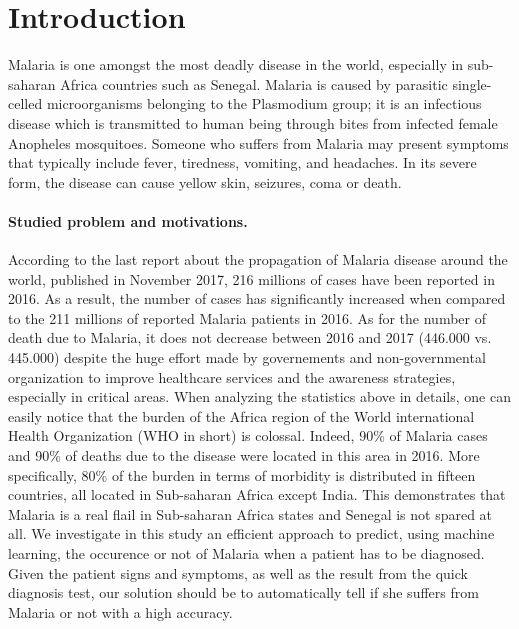 \section{Introduction}\label{intro}
Malaria is one amongst the most deadly disease in the world, especially in sub-saharan Africa countries such as Senegal.
Malaria is caused by parasitic single-celled microorganisms belonging to the Plasmodium group; it is an infectious
disease which is transmitted to human being through bites from infected female Anopheles mosquitoes. Someone who suffers
from  Malaria may present symptoms that typically include fever, tiredness, vomiting, and headaches. In its severe form,
the disease can cause yellow skin, seizures, coma or death.

\paragraph*{Studied problem and motivations.}
According to the last report about the propagation of Malaria disease around the world, published in November 2017, 216 millions of cases have been 
reported in 2016. As a result, the number of cases has significantly increased when compared to the 211 millions of reported Malaria patients in 2016.
As for the number of death due to Malaria, it does not decrease between 2016 and 2017 (446.000 vs. 445.000) despite the huge effort made by governements
and non-governmental organization to improve healthcare services and the awareness strategies, especially in critical areas. 
When analyzing the statistics above in details, one can easily notice that the burden of the Africa region of the World 
international Health Organization (WHO in short) is colossal. Indeed, 90\% of Malaria cases and 90\% of deaths due to the disease were located in this area in 2016.
More specifically, 80\% of the burden in terms of morbidity is distributed in fifteen countries, all located in Sub-saharan Africa except India. This demonstrates
that Malaria is a real flail in Sub-saharan Africa states and Senegal is not spared at all. We investigate in this study an efficient approach to predict, using machine learning, the occurence 
or not of Malaria when a patient has to be diagnosed. Given the patient signs and symptoms, as well as the result from the quick diagnosis test, our solution should be to 
automatically tell if she suffers from Malaria or not with a high accuracy.

